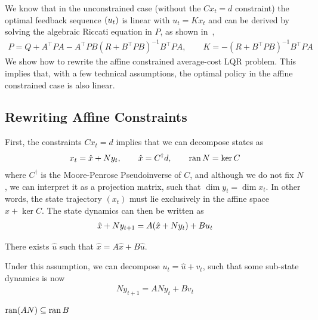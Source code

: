\documentclass[12pt]{article}
\begin{document}
We know that in the unconstrained case (without the \(C x_t = d\) constraint)
the optimal feedback sequence \({\left(u_t\right)}\)
is linear with \(u_t = K x_t\)
and can be derived by solving the algebraic Riccati equation in \(P\),
as shown in~\cite{boyd2008ee363},
\begin{align*}
  P = Q + A^\top P A - A^\top P B (R + B^\top P B)^{-1} B^\top P A,
    \qquad
    K = - (R + B^\top P B)^{-1} B^\top P A
\end{align*}
We show how to rewrite the affine constrained average-cost LQR problem.
This implies that, with a few technical assumptions,
the optimal policy in the affine constrained case is also linear.

\subsection{Rewriting Affine Constraints}

First, the constraints \(C x_t = d\) implies that
we can decompose states as
\begin{align*}
  x_t = \hat{x} + N y_t,
    \qquad
  \hat{x} = C^\dagger d,
    \qquad
  \operatorname{ran} N = \operatorname{ker} C
\end{align*}
where \(C^\dagger\) is the Moore-Penrose Pseudoinverse of \(C\),
and although we do not fix \(N\), we can interpret it as a projection
matrix, such that \(\dim y_t = \dim x_t\).
In other words, the state trajectory \((x_t)\) must lie
exclusively in the affine space \(\hat{x} + \ker C\).
The state dynamics can then be written as
\begin{align*}
  \hat{x} + N y_{t + 1}
    = A {\left(\hat{x} + N y_t\right)} + B u_t
\end{align*}

\begin{assumption}
  There exists \(\hat{u}\) such that \(\hat{x} = A \hat{x} + B \hat{u}\).
\end{assumption}

Under this assumption, we can decompose
\(u_t = \hat{u} + v_t\), such that some sub-state dynamics is now
\begin{align*}
  N y_{t + 1} = A N y_t + B v_t
\end{align*}

\begin{assumption}
  \(\operatorname{ran} (AN) \subseteq \operatorname{ran} B\)
\end{assumption}
\end{document}
